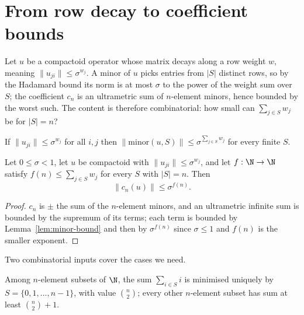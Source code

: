 \section{From row decay to coefficient bounds}

Let $u$ be a compactoid operator whose matrix decays along a row weight $w$, meaning $\lVert
u_{ji} \rVert \leq \sigma^{w_j}$.  A minor of $u$ picks entries from $\lvert S \rvert$ distinct
rows, so by the Hadamard bound its norm is at most $\sigma$ to the power of the weight sum over
$S$; the coefficient $c_n$ is an ultrametric sum of $n$-element minors, hence bounded by the
worst such.  The content is therefore combinatorial: how small can $\sum_{j \in S} w_j$ be for
$\lvert S \rvert = n$?

\begin{lemma}
  \label{lem:minor-bound}
  \leanok
  If $\lVert u_{ji}\rVert \leq \sigma^{w_j}$ for all $i, j$ then $\lVert \mathrm{minor}(u, S)
  \rVert \leq \sigma^{\sum_{j \in S} w_j}$ for every finite $S$.
\end{lemma}

\begin{theorem}
  \label{thm:slope-bound}
  \leanok
  Let $0 \leq \sigma < 1$, let $u$ be compactoid with $\lVert u_{ji}\rVert \leq \sigma^{w_j}$,
  and let $f : \N \to \N$ satisfy $f(n) \leq \sum_{j \in S} w_j$ for every $S$ with $\lvert S
  \rvert = n$.  Then
  \[
    \lVert c_n(u) \rVert \leq \sigma^{f(n)} .
  \]
\end{theorem}

\begin{proof}
  \leanok
  $c_n$ is $\pm$ the sum of the $n$-element minors, and an ultrametric infinite sum is bounded by
  the supremum of its terms; each term is bounded by Lemma~\ref{lem:minor-bound} and then by
  $\sigma^{f(n)}$ since $\sigma \leq 1$ and $f(n)$ is the smaller exponent.
\end{proof}

Two combinatorial inputs cover the cases we need.

\begin{lemma}
  \label{lem:choose-two}
  \leanok
  Among $n$-element subsets of $\N$, the sum $\sum_{i \in S} i$ is minimised uniquely by $S =
  \{0, 1, \dots, n-1\}$, with value $\binom{n}{2}$; every other $n$-element subset has sum at
  least $\binom{n}{2} + 1$.
\end{lemma}

